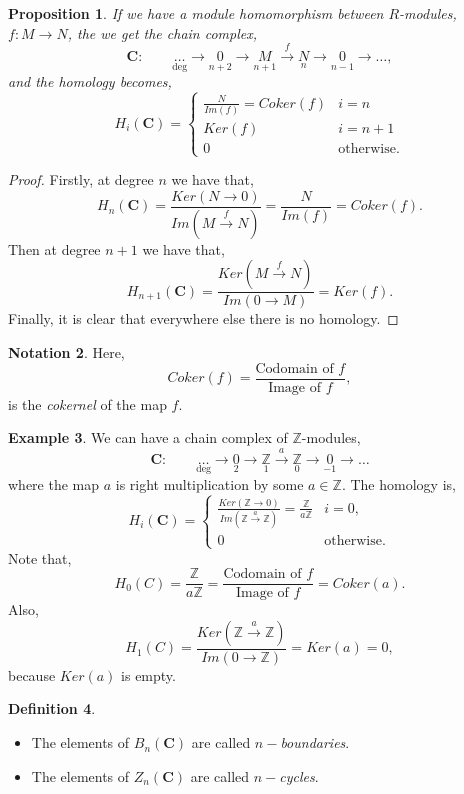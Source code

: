 \documentclass[11.5pt, twoside, a4paper, titlepage]{report}
\providecommand{\equ}[0]{\begin{equation*}}
\providecommand{\eequ}[0] {\end{equation*}}
\providecommand{\bb}[1]{\mathbb{#1}}
\theoremstyle{definition}
\newtheorem{mydef}{Definition}[section]
\newtheorem{note}[mydef]{Notation}
\newtheorem{eg}[mydef]{Example}
\theoremstyle{plain}
\newtheorem{prop}[mydef]{Proposition}
\begin{document}
\begin{prop}  \label{chainhomprop}
If we have a module homomorphism between $R$-modules, $f: M \xrightarrow{} N$, the we get the chain complex,
\equ
\mathbf{C}: \qquad \underset{\text{deg}}{\dots} \xrightarrow{}\underset{n+2}{0} \xrightarrow{} \underset{n+1}{M} \xrightarrow{f}\underset{n}{N} \xrightarrow{} \underset{n-1}{0} \xrightarrow{}\dots ,
\eequ
and the homology becomes,
\equ
H_i(\mathbf{C})=
\begin{cases}
\frac{N}{Im(f)}=Coker(f) & i=n\\
Ker(f) & i=n+1\\
0 & \text{otherwise}.
\end{cases}
\eequ
\end{prop}
\begin{proof}
Firstly, at degree $n$ we have that,
\equ
H_n(\mathbf{C})=\frac{Ker(N\xrightarrow{}0)}{Im(M\xrightarrow{f}N)}=\frac{N}{Im(f)}=Coker(f).
\eequ
Then at degree $n+1$ we have that,
\equ
H_{n+1}(\mathbf{C})=\frac{Ker(M\xrightarrow{f}N)}{Im(0\xrightarrow{}M)}=Ker(f).
\eequ
Finally, it is clear that everywhere else there is no homology.
\end{proof}

\begin{note}
Here, 
\equ
Coker(f)= \frac{\text{Codomain of }f}{\text{Image of }f},
\eequ
is the \emph{cokernel} of the map $f$.
\end{note}

\begin{eg} \label{chainZeg}
We can have a chain complex of $\mathbb{Z}$-modules,
\equ
\mathbf{C}: \qquad \underset{\text{deg}}{\dots} \xrightarrow{}\underset{2}{0} \xrightarrow{} \underset{1}{\mathbb{Z}} \xrightarrow{a}\underset{0}{\mathbb{Z}} \xrightarrow{} \underset{-1}{0} \xrightarrow{}\dots 
\eequ
where the map $a$ is right multiplication by some $a \in \mathbb{Z}$. The homology is,
\equ
H_i(\mathbf{C}) = 
\begin{cases}
\frac{Ker(\mathbb{Z}\xrightarrow{} 0)}{Im(\mathbb{Z}\xrightarrow{a}\mathbb{Z})}=\frac{\mathbb{Z}}{a\mathbb{Z}} & i=0,\\
0 & \text{otherwise}.
\end{cases}
\eequ
Note that,
\equ
H_0(C)=\frac{\bb{Z}}{a\bb{Z}}= \frac{\text{Codomain of }f}{\text{Image of }f}=Coker(a).
\eequ
Also,
\equ
H_1(C)=\frac{Ker(\bb{Z}\xrightarrow{a}\bb{Z})}{Im(0\xrightarrow{}\bb{Z})}=Ker(a)=0,
\eequ
because $Ker(a)$ is empty.
\end{eg}

\begin{mydef}
\begin{itemize}
\item The elements of $B_n(\mathbf{C})$ are called \emph{$n-$boundaries}.
\item The elements of $Z_n(\mathbf{C})$ are called \emph{$n-$cycles}.
\end{itemize}
\end{mydef}
\end{document}
